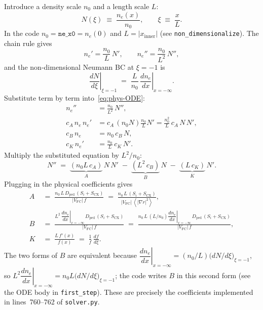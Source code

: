 \documentclass[11pt]{article}
\renewcommand{\ne}{n_{e}}  %
\newcommand{\Vfc}{\lvert V_{\mathrm{FC}}\rvert}
\newcommand{\Si}{S_{i}}
\newcommand{\Scx}{S_{\mathrm{CX}}}
\newcommand{\Dped}{D_{\mathrm{ped}}}
\newcommand{\fsa}[1]{\left\langle #1 \right\rangle}
\newcommand{\gradrsq}{\fsa{|\nabla r|^{2}}}
\newcommand{\neginf}{x=-\infty}
\newcommand{\dneneg}{\left.\dfrac{d\ne}{dx}\right|_{\neginf}}
\newcommand{\xin}{x_{\mathrm{inner}}}
\begin{document}
Introduce a density scale $n_{0}$ and a length scale $L$:
\begin{equation}
  N(\xi) \;\equiv\; \frac{\ne(x)}{n_{0}}, \qquad \xi \;\equiv\; \frac{x}{L}.
\end{equation}
In the code $n_{0}=\texttt{ne\_x0}=\ne(0)$ and $L=|\xin|$
(see \texttt{non\_dimensionalize}).  The chain rule gives
\begin{equation}
  \ne' = \frac{n_{0}}{L}\,N', \qquad \ne'' = \frac{n_{0}}{L^{2}}\,N'',
\end{equation}
and the non-dimensional Neumann BC at $\xi=-1$ is
\begin{equation}
  \left.\frac{dN}{d\xi}\right|_{\xi=-1} \;=\; \frac{L}{n_{0}}\,\dneneg.
\end{equation}
Substitute term by term into~\eqref{eq:phys-ODE}:
\begin{align}
  \ne'' &= \frac{n_{0}}{L^{2}}\,N'', \\
  c_A\,\ne\,\ne' &= c_A\,(n_{0}N)\frac{n_{0}}{L}N' = \frac{n_{0}^{2}}{L}\,c_A\,N\,N', \\
  c_B\,\ne &= n_{0}\,c_B\,N, \\
  c_K\,\ne' &= \frac{n_{0}}{L}\,c_K\,N'.
\end{align}
Multiply the substituted equation by $L^{2}/n_{0}$:
\begin{equation}
  N'' \;=\; \underbrace{(n_{0}L\,c_A)}_{A}\,N\,N'
         \;-\; \underbrace{(L^{2}\,c_B)}_{B}\,N
         \;-\; \underbrace{(L\,c_K)}_{K}\,N'.
\end{equation}
Plugging in the physical coefficients gives
\begin{equation}
  \boxed{\;
    \begin{aligned}
      A \;&=\; \frac{n_{0}\,L\,\Dped\,(\Si+\Scx)}{\Vfc\,f}
           \;=\; \frac{n_{0}\,L\,(\Si+\Scx)}{\Vfc\,\gradrsq}, \\[4pt]
      B \;&=\; \frac{L^{2}\,\dneneg\,\Dped\,(\Si+\Scx)}{\Vfc\,f}
           \;=\; \frac{n_{0}\,L\,(L/n_{0})\dneneg\,\Dped\,(\Si+\Scx)}{\Vfc\,f}, \\[4pt]
      K \;&=\; \frac{L\,f'(x)}{f(x)} \;=\; \frac{1}{f}\,\frac{df}{d\xi}.
    \end{aligned}
  \;}
\end{equation}
The two forms of $B$ are equivalent because
$\dneneg = (n_{0}/L)\bigl(dN/d\xi\bigr)_{\xi=-1}$, so
$L^{2}\dneneg = n_{0}L\bigl(dN/d\xi\bigr)_{\xi=-1}$; the code writes $B$ in
this second form (see the ODE body in \texttt{first\_step}).  These are
precisely the coefficients implemented in lines~760--762 of
\texttt{solver.py}.
\end{document}
